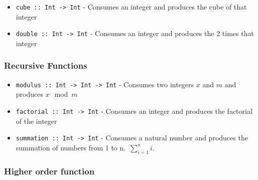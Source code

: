 \begin{itemize}
\tightlist
\item
  \texttt{cube\ ::\ Int\ -\textgreater{}\ Int} - Consumes an integer and
  produces the cube of that integer
\item
  \texttt{double\ ::\ Int\ -\textgreater{}\ Int} - Consumes an integer
  and produces the 2 times that integer
\end{itemize}

\subsubsection{\texorpdfstring{\textbf{Recursive
Functions}}{Recursive Functions}}\label{lab-exercise-2-exploring-haskell.md__recursive-functions}

\begin{itemize}
\item
  \texttt{modulus\ ::\ Int\ -\textgreater{}\ Int\ -\textgreater{}\ Int}
  - Consumes two integers \(x\) and \(m\) and produces \(x \mod m\)
\item
  \texttt{factorial\ ::\ Int\ -\textgreater{}\ Int} - Consumes an
  integer and produces the factorial of the integer
\item
  \texttt{summation\ ::\ Int\ -\textgreater{}\ Int} - Consumes a natural
  number and produces the summation of numbers from 1 to
  n.~\(\sum_{i=1}^{n}{i}\).

\begin{Shaded}
\begin{Highlighting}[]
  \OtherTok{{-}\textgreater{}} 
\OtherTok{=} \OperatorTok{\textless{}=} \NormalTok{) }\OperatorTok{+}\OperatorTok{{-}}\NormalTok{)))}
\end{Highlighting}
\end{Shaded}
\end{itemize}

\subsubsection{Higher order
function}\label{lab-exercise-2-exploring-haskell.md__higher-order-function}

